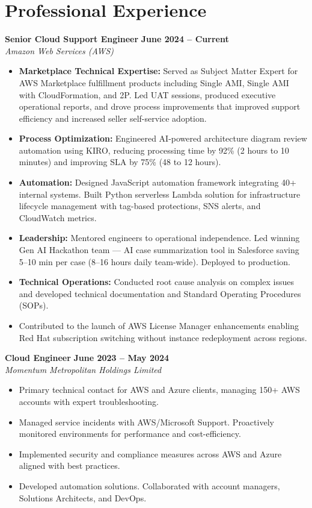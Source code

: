 \documentclass[11pt,a4paper]{article}
\begin{document}
\section{Professional Experience}

\textbf{Senior Cloud Support Engineer} \hfill \textbf{June 2024 -- Current}\\
\textit{Amazon Web Services (AWS)}
\begin{itemize}
  \item \textbf{Marketplace Technical Expertise:} Served as Subject Matter Expert for AWS Marketplace fulfillment products including Single AMI, Single AMI with CloudFormation, and 2P. Led UAT sessions, produced executive operational reports, and drove process improvements that improved support efficiency and increased seller self-service adoption.
  \item \textbf{Process Optimization:} Engineered AI-powered architecture diagram review automation using KIRO, reducing processing time by 92\% (2 hours to 10 minutes) and improving SLA by 75\% (48 to 12 hours).
  \item \textbf{Automation:} Designed JavaScript automation framework integrating 40+ internal systems. Built Python serverless Lambda solution for infrastructure lifecycle management with tag-based protections, SNS alerts, and CloudWatch metrics.
  \item \textbf{Leadership:} Mentored engineers to operational independence. Led winning Gen AI Hackathon team --- AI case summarization tool in Salesforce saving 5--10 min per case (8--16 hours daily team-wide). Deployed to production.
  \item \textbf{Technical Operations:} Conducted root cause analysis on complex issues and developed technical documentation and Standard Operating Procedures (SOPs).
  \item Contributed to the launch of AWS License Manager enhancements enabling Red Hat subscription switching without instance redeployment across regions.
\end{itemize}

\textbf{Cloud Engineer} \hfill \textbf{June 2023 -- May 2024}\\
\textit{Momentum Metropolitan Holdings Limited}
\begin{itemize}
  \item Primary technical contact for AWS and Azure clients, managing 150+ AWS accounts with expert troubleshooting.
  \item Managed service incidents with AWS/Microsoft Support. Proactively monitored environments for performance and cost-efficiency.
  \item Implemented security and compliance measures across AWS and Azure aligned with best practices.
  \item Developed automation solutions. Collaborated with account managers, Solutions Architects, and DevOps.
\end{itemize}
\end{document}
